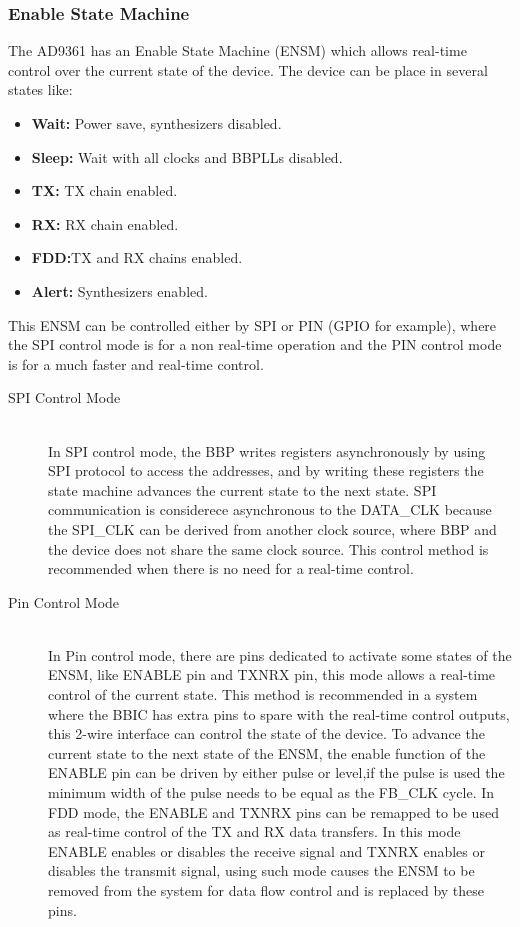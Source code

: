 \subsubsection{Enable State Machine}

The AD9361 has an Enable State Machine (ENSM) which allows real-time control
over the current state of the device. The device can be place in several states
like:

\begin{itemize}
		\item \textbf{Wait:} Power save, synthesizers disabled.
		\item \textbf{Sleep:} Wait with all clocks and BBPLLs disabled.
		\item \textbf{TX:} TX chain enabled.
		\item \textbf{RX:} RX chain enabled.
		\item \textbf{FDD:}TX and RX chains enabled.
		\item \textbf{Alert:} Synthesizers enabled.
	\end{itemize}
	This ENSM can be controlled either by SPI or PIN (GPIO for example), where the
SPI control mode is for a non real-time operation and the PIN control mode is
for a much faster and real-time control.


\begin{description}
	\item[SPI Control Mode] \hfill \\
	In SPI control mode, the BBP writes registers asynchronously by using SPI
protocol to access the addresses, and by writing these registers the state
machine advances the current state to the next state. SPI communication is
considerece asynchronous to the DATA\_CLK because the SPI\_CLK can be derived
from another clock source, where BBP and the device does not share the same
clock source. This control method is recommended when there is no need for a
real-time control.
	\item[Pin Control Mode] \hfill \\
	In Pin control mode, there are pins dedicated to activate some states of the
ENSM, like ENABLE pin and TXNRX pin, this mode allows a real-time control of the
current state. This method is recommended in a system where the BBIC has extra
pins to spare with the real-time control outputs, this 2-wire interface can
control the state of the device. To advance the current state to the next state
of the ENSM, the enable function of the ENABLE pin can be driven by either pulse
or level,if the pulse is used the minimum width of the pulse needs to be equal
as the FB\_CLK cycle. In FDD mode, the ENABLE and TXNRX pins can be remapped to
be used as real-time control of the TX and RX data transfers. In this mode
ENABLE enables or disables the receive signal and TXNRX enables or disables the
transmit signal, using such mode  causes the ENSM to be removed from the system
for data flow control and is replaced by these pins.
\end{description}

